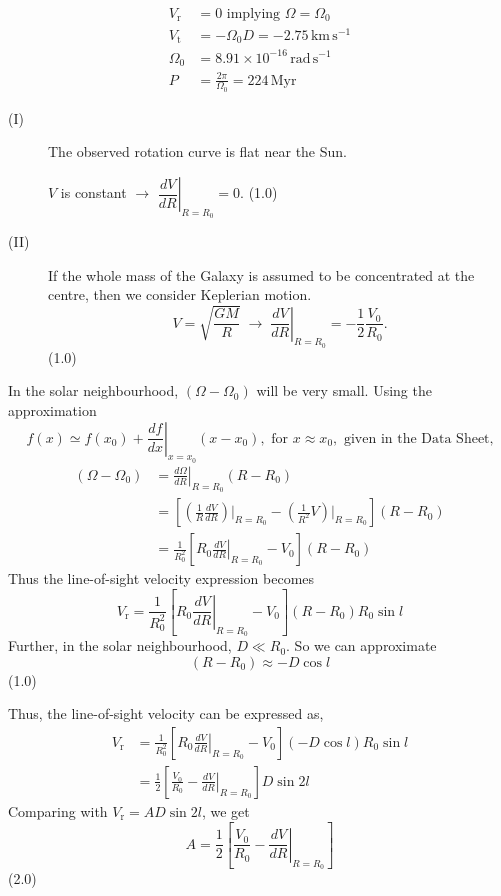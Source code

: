 \begin{description}
  \begin{align*}
    V_{\mathrm{r}} &= 0 \text{ implying } \Omega = \Omega_0
       \tag*{(0.5)}\\
    V_{\mathrm{t}} &= -\Omega_0 D = -2.75\,\mathrm{km\,s^{-1}}
       \tag*{(0.5)}\\
    \Omega_0 &= 8.91\times10^{-16}\,\mathrm{rad\,s^{-1}}
       \tag*{(1.0)}\\
    P &= \frac{2\pi}{\Omega_0} = 224\,\mathrm{Myr}
       \tag*{(1.0)}
  \end{align*}
\item[(T06.3a)] \mbox{}
  \begin{description}
  \item[(I)] The observed rotation curve is flat near the Sun.

    $V$ is constant $\rightarrow$
    $\left.\dfrac{dV}{dR}\right|_{R=R_0} = 0$. \hfill(1.0)
  \item[(II)] If the whole mass of the Galaxy is assumed to be concentrated
    at the centre, then we consider Keplerian motion.
    \[
      V = \sqrt{\frac{GM}{R}}
      \;\rightarrow\;
      \left.\frac{dV}{dR}\right|_{R=R_0} = -\frac{1}{2}\frac{V_0}{R_0}.
    \]
    \hfill(1.0)
  \end{description}
\item[(T06.3b)] In the solar neighbourhood, $(\Omega - \Omega_0)$ will be
  very small. Using the approximation
  \[
    f(x) \simeq f(x_0)
      + \left.\frac{df}{dx}\right|_{x=x_0}(x - x_0),
    \text{ for } x \approx x_0, \text{ given in the Data Sheet,}
  \]
  \begin{align*}
    (\Omega - \Omega_0)
      &= \left.\frac{d\Omega}{dR}\right|_{R=R_0}(R - R_0)
       \tag*{(2.0)}\\
      &= \left[\left(\frac{1}{R}\frac{dV}{dR}\right)\bigg|_{R=R_0}
         - \left(\frac{1}{R^2}V\right)\bigg|_{R=R_0}\right](R - R_0)\\
      &= \frac{1}{R_0^2}\left[R_0\left.\frac{dV}{dR}\right|_{R=R_0}
         - V_0\right](R - R_0)
  \end{align*}
  Thus the line-of-sight velocity expression becomes
  \[
    V_{\mathrm{r}} = \frac{1}{R_0^2}
      \left[R_0\left.\frac{dV}{dR}\right|_{R=R_0} - V_0\right]
      (R - R_0)R_0\sin l
  \]
  Further, in the solar neighbourhood, $D \ll R_0$. So we can approximate
  \[
    (R - R_0) \approx -D\cos l
  \]
  \hfill(1.0)

  Thus, the line-of-sight velocity can be expressed as,
  \begin{align*}
    V_{\mathrm{r}}
      &= \frac{1}{R_0^2}
         \left[R_0\left.\frac{dV}{dR}\right|_{R=R_0} - V_0\right]
         (-D\cos l)R_0\sin l\\
      &= \frac{1}{2}
         \left[\frac{V_0}{R_0} - \left.\frac{dV}{dR}\right|_{R=R_0}\right]
         D\sin 2l
  \end{align*}
  Comparing with $V_{\mathrm{r}} = AD\sin 2l$, we get
  \[
    A = \frac{1}{2}
        \left[\frac{V_0}{R_0} - \left.\frac{dV}{dR}\right|_{R=R_0}\right]
  \]
  \hfill(2.0)


\end{description}
